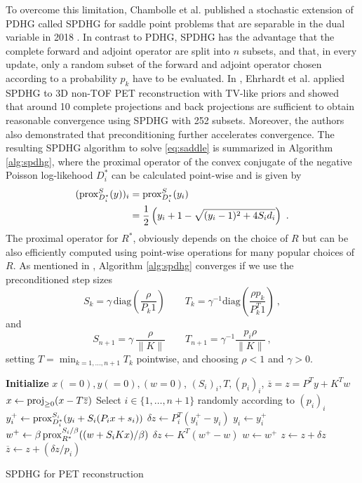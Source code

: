 To overcome this limitation, Chambolle et al. published a stochastic extension of PDHG called SPDHG 
for saddle point problems that are separable in the dual variable in 2018 \cite{Chambolle2018}.
In contrast to PDHG, SPDHG has the advantage that the complete forward and adjoint operator are
split into $n$ subsets, and that, in every update, only a random subset of the forward
and adjoint operator chosen according to a probability $p_k$ have to be evaluated.
In \cite{Ehrhardt2019}, Ehrhardt et al. applied SPDHG to 3D non-TOF PET reconstruction with TV-like
priors and showed that around 10 complete projections and back projections are sufficient 
to obtain reasonable convergence using SPDHG with 252 subsets.
Moreover, the authors also demonstrated that preconditioning further accelerates convergence.
The resulting SPDHG algorithm to solve \eqref{eq:saddle} is summarized in Algorithm \ref{alg:spdhg},
where the proximal operator of the convex conjugate of the negative Poisson log-likehood $D_i^*$ 
can be calculated point-wise and is given by
%
\begin{equation}
\begin{split}
(\operatorname{prox}_{D_i^*}^{S}(y))_i &= \operatorname{prox}_{D_i^*}^{S}(y_i) \\ 
&= \frac{1}{2} \left(y_i + 1 - \sqrt{ (y_i-1)^2 + 4 S_i d_i} \right) \ .
\end{split}
\label{eq:proxD}
\end{equation} 
%
The proximal operator for $R^*$, obviously depends on the choice of $R$ but can be also efficiently 
computed using point-wise operations for many popular choices of $R$.
As mentioned in \cite{Ehrhardt2019}, Algorithm \ref{alg:spdhg} converges if we use the preconditioned
step sizes
%
\[ S_k = \gamma \, \text{diag}(\frac{\rho}{P_k 1} )\qquad  T_k = \gamma^{-1} \text{diag}(\frac{\rho p_k}{P^T_k 1}) \ , \]
% 
and
%
\[ S_{n+1} = \gamma \, \frac{\rho}{\|K\|} \qquad T_{n+1} = \gamma^{-1} \frac{p_i\rho}{\|K\|} \ , \]
%
setting $T = \min_{k=1,\ldots,n+1} T_k$ pointwise, and choosing $\rho<1$ and $\gamma>0$.
%
\begin{algorithm}[t]
\begin{algorithmic}[1]
\small
\State \textbf{Initialize} $x(=0),y(=0),(w=0)$, $(S_i)_i,T,(p_i)_i$,
\State $\overline{z} = z = P^T y + K^T w$
\Repeat
	\State $x \gets \operatorname{proj}_{\geq 0} (x - T \overline{z})$
	\State Select $i \in \{ 1,\ldots,n+1\} $ randomly according to $(p_i)_i$
	\State $y_i^+ \gets \operatorname{prox}_{D_i^*}^{S_i} ( y_i + S_i  ( P_i x + s_i))$
	\State $\delta z \gets P_i^T (y_i^+ - y_i)$
	\State $y_i \gets y_i^+$
  \Else
	\State $w^+ \gets \beta \operatorname{prox}_{R^*}^{S_i/\beta} ((w + S_i  K x)/\beta)$
	\State $\delta z \gets K^T (w^+ - w)$
	\State $w \gets w^+$
  \EndIf
	\State $z \gets z + \delta z$
	\State $\overline{z} \gets  z + (\delta z/p_i)$
\State {}
\end{algorithmic}
\caption{SPDHG for PET reconstruction \cite{Ehrhardt2019}}
\label{alg:spdhg}
\end{algorithm}
%


